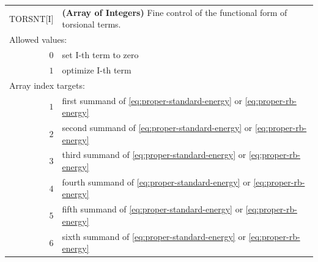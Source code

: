 \documentclass[10pt,a4paper,openany]{memoir}
\numberwithin{equation}{section}
\begin{document}
{
\begin{tabular}{r@{ : }l}
\label{descr:torsnt}
    TORSNT[I]&\textbf{(Array of Integers)} Fine control of the functional form of torsional terms.                                               \\ 
\multicolumn{2}{l}{Allowed values:} \\ 
     \(0\)&set I-th term to zero                                                                                \\ 
     \(1\)&optimize I-th term                                                                                   \\ 
\multicolumn{2}{l}{Array index targets:} \\ 
     \(1\)&first summand of \autoref{eq:proper-standard-energy} or \autoref{eq:proper-rb-energy}                                                                                          \\ 
     \(2\)&second summand of \autoref{eq:proper-standard-energy} or \autoref{eq:proper-rb-energy}                                                                                         \\ 
     \(3\)&third summand of \autoref{eq:proper-standard-energy} or \autoref{eq:proper-rb-energy}                                                                                          \\ 
     \(4\)&fourth summand of \autoref{eq:proper-standard-energy} or \autoref{eq:proper-rb-energy}                                                                                         \\ 
     \(5\)&fifth summand of \autoref{eq:proper-standard-energy} or \autoref{eq:proper-rb-energy}                                                                                          \\ 
     \(6\)&sixth summand of \autoref{eq:proper-standard-energy} or \autoref{eq:proper-rb-energy}                                                                                          \\ 
\end{tabular}
\vspace{1ex}
}
\end{document}
